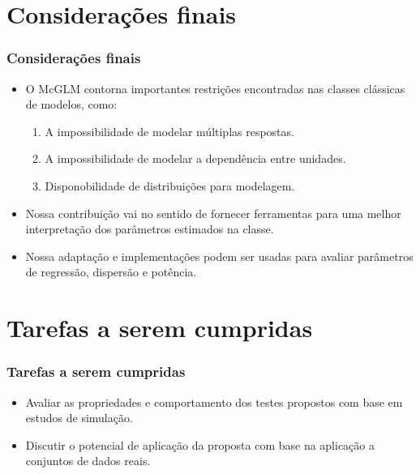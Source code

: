 \documentclass[10pt,
  aspectratio=169,
  serif,
  mathserif,
  professionalfont,
  compress,
  handout,
  ]{beamer}\usepackage[]{graphicx}\usepackage[]{color}
\begin{document}

\section{Considerações finais}


\begin{frame}
  \frametitle{Considerações finais}

\begin{itemize}

  \item O McGLM contorna importantes restrições encontradas nas classes clássicas de modelos, como: 

  \begin{enumerate}
    \item A impossibilidade de modelar múltiplas respostas.
    \item A impossibilidade de modelar a dependência entre unidades. 
    \item Disponobilidade de distribuições para modelagem.
  \end{enumerate}

    \item Nossa contribuição vai no sentido de fornecer ferramentas para uma melhor interpretação dos parâmetros estimados na classe.
    
    \item Nossa adaptação e implementações podem ser usadas para avaliar parâmetros de regressão, dispersão e potência.

\end{itemize}


\end{frame}



\section{Tarefas a serem cumpridas}


\begin{frame}
  \frametitle{Tarefas a serem cumpridas}

\begin{itemize}
  \item Avaliar as propriedades e comportamento dos testes propostos com base em estudos de simulação.
  
  \item Discutir o potencial de aplicação da proposta com base na aplicação a conjuntos de dados reais.
  
\end{itemize}

\end{frame}
\end{document}

